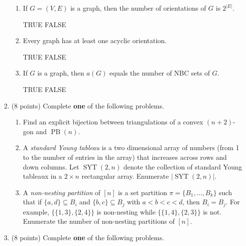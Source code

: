 \documentclass[11pt]{article}
\theoremstyle{definition}
\DeclareMathOperator{\SYT}{SYT}
\DeclareMathOperator{\PB}{PB}
\begin{document}
\begin{enumerate}
\begin{enumerate}
\item If $G=(V,E)$ is a graph, then the number of orientations of $G$ is $2^{|E|}$.

\smallskip

TRUE \qquad FALSE

\item Every graph has at least one acyclic orientation.

\smallskip

TRUE \qquad FALSE

\item If $G$ is a graph, then $a(G)$ equals the number of NBC sets of $G$.

\smallskip

TRUE \qquad FALSE

\end{enumerate}

\item (8 points) Complete \textbf{one} of the following problems.

\begin{enumerate}

\item Find an explicit bijection between triangulations of a convex $(n+2)$-gon and $\PB(n)$.


\item A \emph{standard Young tableau} is a two dimensional array of numbers (from 1 to the number of entries in the array) that increases across rows and down columns. Let $\SYT(2, n)$ denote the collection of standard Young tableaux in a $2\times n$ rectangular array. Enumerate $|\SYT(2,n)|$.

\item A \emph{non-nesting partition} of $[n]$ is a set partition $\pi=\{B_1,\ldots,B_k\}$ such that if $\{a,d\}\subseteq B_i$ and $\{b,c\}\subseteq B_j$ with $a<b<c<d$, then $B_i=B_j$.  For example, $\{\{1,3\},\{2,4\}\}$ is non-nesting while $\{\{1,4\},\{2,3\}\}$ is not.  Enumerate the number of non-nesting partitions of $[n]$.

\end{enumerate}

\item (8 points) Complete \textbf{one} of the following problems.


\end{enumerate}
\end{document}
